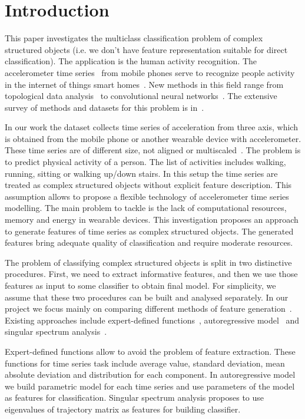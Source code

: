 \documentclass{llncs}
\begin{document}
\section{Introduction}
This paper investigates the multiclass classification problem of complex structured objects (i.e. we don't have feature representation suitable for direct classification). The application is the human activity recognition. 
The accelerometer time series~\cite{ignatov2016human,lu2016towards,wang2014human} from mobile phones serve to recognize people activity in the internet of things smart homes~\cite{budnik2016learned,lu2016activity}.
New methods in this field range from topological data analysis~\cite{umeda2017time} to convolutional neural networks~\cite{hammerla2016deep}. 
The extensive survey of methods and datasets for this problem is in~\cite{incel2013review}. 

In our work the dataset collects time series of acceleration from three axis, which is obtained from the mobile phone or another wearable device with accelerometer. 
These time series are of different size, not aligned or multiscaled~\cite{geurts2001pattern}.
The problem is to predict physical activity of a person. 
The list of activities includes walking, running, sitting or walking up/down stairs.
In this setup the time series are treated as complex structured objects without explicit feature description. 
This assumption allows to propose a flexible technology of accelerometer time series modelling. 
The main problem to tackle is the lack of computational resources, memory and energy in wearable devices. This investigation proposes an approach to generate features of time series as complex structured objects. The generated features bring adequate quality of classification and require moderate resources.

The problem of classifying complex structured objects is split in two distinctive procedures. 
First, we need to extract informative features, and then we use those features as input to some classifier to obtain final model. 
For simplicity, we assume that these two procedures can be built and analysed separately. 
In our project we focus mainly on comparing different methods of feature generation~\cite{karasikov2016feature,ivkin2015ts}. Existing approaches include expert-defined functions~\cite{kwapisz2011activity}, autoregressive model~\cite{lukashin2003adaptive} and singular spectrum analysis~\cite{hassani2007singular}. 

Expert-defined functions allow to avoid the problem of feature extraction. These functions for time series task include average value, standard deviation, mean absolute deviation and distribution for each component. In autoregressive model we build parametric model for each time series and use parameters of the model as features for classification. Singular spectrum analysis proposes to use eigenvalues of trajectory matrix as features for building classifier.
\end{document}
